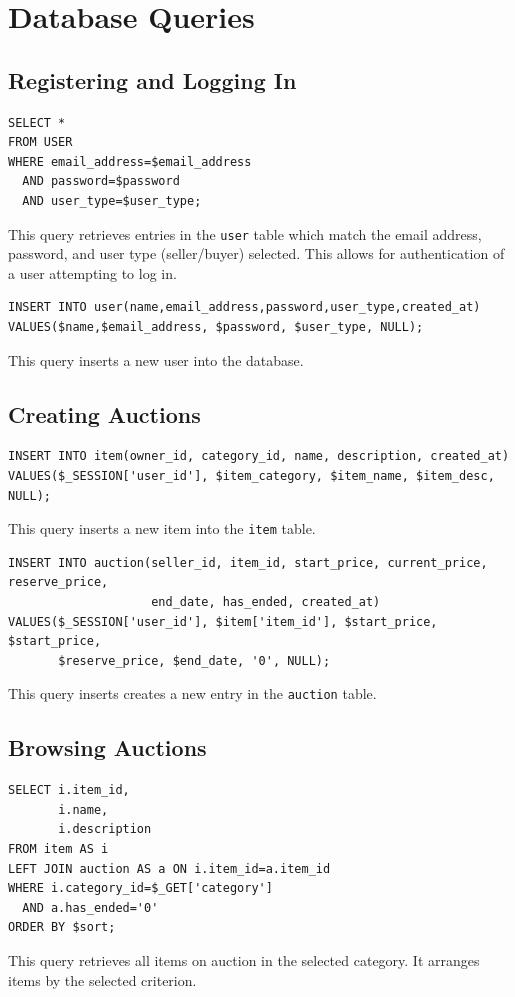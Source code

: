 \documentclass{article}
\begin{document}
\section{Database Queries}

\subsection{Registering and Logging In}
\begin{verbatim}
SELECT *
FROM USER
WHERE email_address=$email_address
  AND password=$password
  AND user_type=$user_type;
\end{verbatim}
This query retrieves entries in the \texttt{user} table which match the email address, password, and user type (seller/buyer) selected. This allows for authentication of a user attempting to log in.

\begin{verbatim}
INSERT INTO user(name,email_address,password,user_type,created_at)
VALUES($name,$email_address, $password, $user_type, NULL);
\end{verbatim}
This query inserts a new user into the database.

\subsection{Creating Auctions}
\begin{verbatim}
INSERT INTO item(owner_id, category_id, name, description, created_at)
VALUES($_SESSION['user_id'], $item_category, $item_name, $item_desc, NULL);
\end{verbatim}
This query inserts a new item into the \texttt{item} table.

\begin{verbatim}
INSERT INTO auction(seller_id, item_id, start_price, current_price, reserve_price,
                    end_date, has_ended, created_at)
VALUES($_SESSION['user_id'], $item['item_id'], $start_price, $start_price,
       $reserve_price, $end_date, '0', NULL);
\end{verbatim}
This query inserts creates a new entry in the \texttt{auction} table.

\subsection{Browsing Auctions}
\begin{verbatim}
SELECT i.item_id,
       i.name,
       i.description
FROM item AS i
LEFT JOIN auction AS a ON i.item_id=a.item_id
WHERE i.category_id=$_GET['category']
  AND a.has_ended='0'
ORDER BY $sort;
\end{verbatim}
This query retrieves all items on auction in the selected category. It arranges items by the selected criterion.
\end{document}
